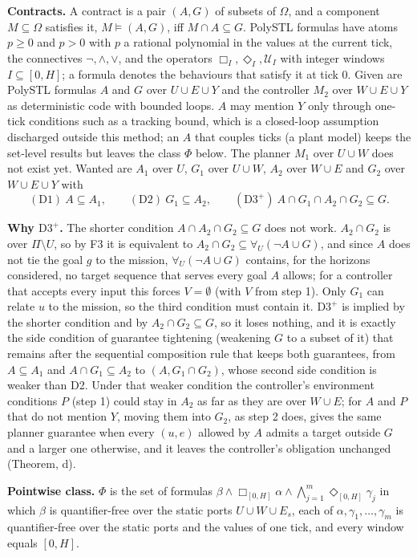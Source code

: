 \documentclass[10pt,a4paper]{article}
\newcommand{\fa}{\forall}
\newcommand{\Dthree}{\mathrm{D3}^{+}}
\begin{document}
\textbf{Contracts.} A contract is a pair $(A,G)$ of subsets of $\Omega$, and a component $M\subseteq\Omega$ satisfies it, $M\models(A,G)$, iff $M\cap A\subseteq G$. PolySTL formulas have atoms $p\ge0$ and $p>0$ with $p$ a rational polynomial in the values at the current tick, the connectives $\lnot,\wedge,\vee$, and the operators $\Box_I,\Diamond_I,\mathcal U_I$ with integer windows $I\subseteq[0,H]$; a formula denotes the behaviours that satisfy it at tick $0$. Given are PolySTL formulas $A$ and $G$ over $U\cup E\cup Y$ and the controller $M_2$ over $W\cup E\cup Y$ as deterministic code with bounded loops. $A$ may mention $Y$ only through one-tick conditions such as a tracking bound, which is a closed-loop assumption discharged outside this method; an $A$ that couples ticks (a plant model) keeps the set-level results but leaves the class $\Phi$ below. The planner $M_1$ over $U\cup W$ does not exist yet. Wanted are $A_1$ over $U$, $G_1$ over $U\cup W$, $A_2$ over $W\cup E$ and $G_2$ over $W\cup E\cup Y$ with
\[(\mathrm{D1})\ A\subseteq A_1,\qquad(\mathrm{D2})\ G_1\subseteq A_2,\qquad(\Dthree)\ A\cap G_1\cap A_2\cap G_2\subseteq G.\]

\textbf{Why $\Dthree$.} The shorter condition $A\cap A_2\cap G_2\subseteq G$ does not work. $A_2\cap G_2$ is over $\Pi\setminus U$, so by F3 it is equivalent to $A_2\cap G_2\subseteq\fa_U(\lnot A\cup G)$, and since $A$ does not tie the goal $g$ to the mission, $\fa_U(\lnot A\cup G)$ contains, for the horizons considered, no target sequence that serves every goal $A$ allows; for a controller that accepts every input this forces $V=\emptyset$ (with $V$ from step 1). Only $G_1$ can relate $u$ to the mission, so the third condition must contain it. $\Dthree$ is implied by the shorter condition and by $A_2\cap G_2\subseteq G$, so it loses nothing, and it is exactly the side condition of guarantee tightening (weakening $G$ to a subset of it) that remains after the sequential composition rule that keeps both guarantees, from $A\subseteq A_1$ and $A\cap G_1\subseteq A_2$ to $(A,G_1\cap G_2)$, whose second side condition is weaker than D2. Under that weaker condition the controller's environment conditions $P$ (step 1) could stay in $A_2$ as far as they are over $W\cup E$; for $A$ and $P$ that do not mention $Y$, moving them into $G_2$, as step 2 does, gives the same planner guarantee when every $(u,e)$ allowed by $A$ admits a target outside $G$ and a larger one otherwise, and it leaves the controller's obligation unchanged (Theorem, d).

\textbf{Pointwise class.} $\Phi$ is the set of formulas $\beta\wedge\Box_{[0,H]}\alpha\wedge\bigwedge_{j=1}^{m}\Diamond_{[0,H]}\gamma_j$ in which $\beta$ is quantifier-free over the static ports $U\cup W\cup E_s$, each of $\alpha,\gamma_1,\dots,\gamma_m$ is quantifier-free over the static ports and the values of one tick, and every window equals $[0,H]$.
\end{document}
